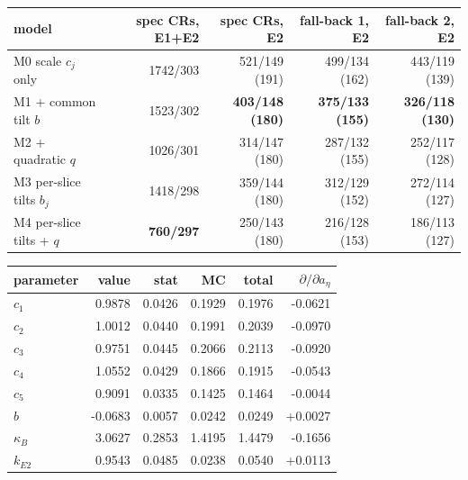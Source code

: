 \begin{tabular}{lrrrr}
\toprule
model & spec CRs, E1+E2 & spec CRs, E2 & fall-back 1, E2 & fall-back 2, E2 \\
\midrule
M0 scale $c_j$ only & 1742/303 & 521/149 (191) & 499/134 (162) & 443/119 (139) \\
M1 + common tilt $b$ & 1523/302 & \textbf{403/148 (180)} & \textbf{375/133 (155)} & \textbf{326/118 (130)} \\
M2 + quadratic $q$ & 1026/301 & 314/147 (180) & 287/132 (155) & 252/117 (128) \\
M3 per-slice tilts $b_j$ & 1418/298 & 359/144 (180) & 312/129 (152) & 272/114 (127) \\
M4 per-slice tilts + $q$ & \textbf{760/297} & 250/143 (180) & 216/128 (153) & 186/113 (127) \\
\bottomrule
\end{tabular}

\begin{tabular}{lrrrrr}
\toprule
parameter & value & stat & MC & total & $\partial/\partial a_\eta$ \\
\midrule
$c_1$ & 0.9878 & 0.0426 & 0.1929 & 0.1976 & -0.0621 \\
$c_2$ & 1.0012 & 0.0440 & 0.1991 & 0.2039 & -0.0970 \\
$c_3$ & 0.9751 & 0.0445 & 0.2066 & 0.2113 & -0.0920 \\
$c_4$ & 1.0552 & 0.0429 & 0.1866 & 0.1915 & -0.0543 \\
$c_5$ & 0.9091 & 0.0335 & 0.1425 & 0.1464 & -0.0044 \\
$b$ & -0.0683 & 0.0057 & 0.0242 & 0.0249 & +0.0027 \\
$\kappa_B$ & 3.0627 & 0.2853 & 1.4195 & 1.4479 & -0.1656 \\
$k_{E2}$ & 0.9543 & 0.0485 & 0.0238 & 0.0540 & +0.0113 \\
\bottomrule
\end{tabular}
